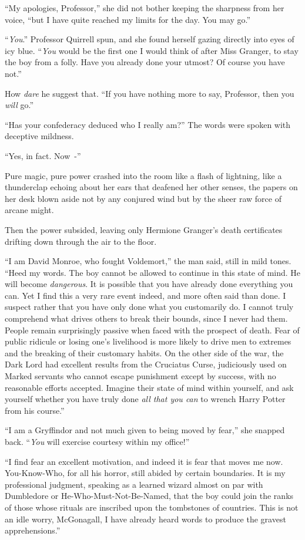 ``My apologies, Professor,'' she did not bother keeping the sharpness from her voice, ``but I have quite reached my limits for the day. You may go.''

``\emph{You}.'' Professor Quirrell spun, and she found herself gazing directly into eyes of icy blue. ``\emph{You} would be the first one I would think of after Miss Granger, to stay the boy from a folly. Have you already done your utmost? Of course you have not.''

How \emph{dare} he suggest that. ``If you have nothing more to say, Professor, then you \emph{will} go.''

``Has your confederacy deduced who I really am?'' The words were spoken with deceptive mildness.

``Yes, in fact. Now~-''

Pure magic, pure power crashed into the room like a flash of lightning, like a thunderclap echoing about her ears that deafened her other senses, the papers on her desk blown aside not by any conjured wind but by the sheer raw force of arcane might.

Then the power subsided, leaving only Hermione Granger's death certificates drifting down through the air to the floor.

``I am David Monroe, who fought Voldemort,'' the man said, still in mild tones. ``Heed my words. The boy cannot be allowed to continue in this state of mind. He will become \emph{dangerous}. It is possible that you have already done everything you can. Yet I find this a very rare event indeed, and more often said than done. I suspect rather that you have only done what you customarily do. I cannot truly comprehend what drives others to break their bounds, since I never had them. People remain surprisingly passive when faced with the prospect of death. Fear of public ridicule or losing one's livelihood is more likely to drive men to extremes and the breaking of their customary habits. On the other side of the war, the Dark Lord had excellent results from the Cruciatus Curse, judiciously used on Marked servants who cannot escape punishment except by success, with no reasonable efforts accepted. Imagine their state of mind within yourself, and ask yourself whether you have truly done \emph{all that you can} to wrench Harry Potter from his course.''

``I am a Gryffindor and not much given to being moved by fear,'' she snapped back. ``\emph{You} will exercise courtesy within my office!''

``I find fear an excellent motivation, and indeed it is fear that moves me now. You-Know-Who, for all his horror, still abided by certain boundaries. It is my professional judgment, speaking as a learned wizard almost on par with Dumbledore or He-Who-Must-Not-Be-Named, that the boy could join the ranks of those whose rituals are inscribed upon the tombstones of countries. This is not an idle worry, McGonagall, I have already heard words to produce the gravest apprehensions.''

